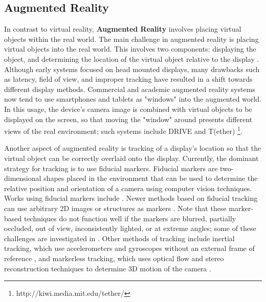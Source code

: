 \documentclass[pageno]{jpaper}
\begin{document}
\subsection{Augmented Reality}
In contrast to virtual reality, {\bf Augmented Reality} involves placing virtual objects within the real world. The main challenge
in augmented reality is placing virtual objects into the real world. This involves two components: displaying the object, and
determining the location of the virtual object relative to the display \cite{zhou2008trends}. Although early systems focused on head mounted displays,
many drawbacks such as latency, field of view, and improper tracking \cite{hoffman2008vergence} have resulted in a shift towards different display methods.
Commercial and academic augmented reality systems now tend to use smartphones and tablets as "windows" into the augmented world. In this usage, the device's camera
image is combined with virtual objects to be displayed on the screen, so that moving the "window" around presents different views of the real environment; such systems
include DRIVE \cite{kim2011drive} and T(ether) \footnote{http://kiwi.media.mit.edu/tether/}.

Another aspect of augmented reality is tracking of a display's location so that the virtual object can be correctly overlaid onto the display.
Currently, the dominant strategy for tracking is to use fiducial markers. Fiducial markers are two-dimensional shapes placed in the environment
that can be used to determine the relative position and orientation of a camera using computer vision techniques. Works using fiducial markers include
\cite{kato1999marker, artoolkit, dedual2011creating}. Newer methods based on fiducial tracking can use arbitrary 2D images or structures as markers \cite{ferrari2001markerless, simon2000markerless}.
Note that these marker-based techniques do not function
well if the markers are blurred, partially occluded, out of view, inconsistently lighted, or at extreme angles; some of these challenges are investigated in \cite{fiala2010designing}. Other methods of tracking include inertial
tracking, which use accelerometers and gyroscopes without an external frame of reference \cite{lang2002inertial}, and markerless tracking, which uses optical flow and
stereo reconstruction techniques to determine 3D motion of the camera \cite{comport2006real}.
\end{document}
